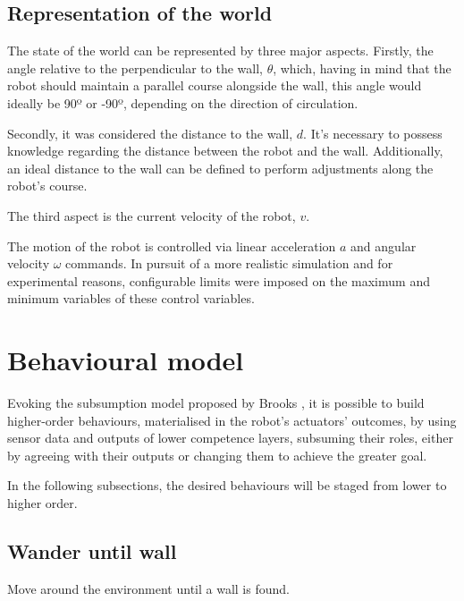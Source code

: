 \documentclass[conference]{IEEEtran}
\begin{document}

\subsection{Representation of the world} 

The state of the world can be represented by three major aspects. Firstly, the angle relative to the perpendicular to the wall, $\theta$, which, having in mind that the robot should maintain a parallel course alongside the wall, this angle would ideally be 90º or -90º, depending on the direction of circulation.

Secondly, it was considered the distance to the wall, $d$. It's necessary to possess knowledge regarding the distance between the robot and the wall. Additionally, an ideal distance to the wall can be defined to perform adjustments along the robot's course.

The third aspect is the current velocity of the robot, $v$. 

The motion of the robot is controlled via linear acceleration $a$ and angular velocity $\omega$ commands. In pursuit of a more realistic simulation and for experimental reasons, configurable limits were imposed on the maximum and minimum variables of these control variables. 

\section{Behavioural model} \label{behaviour}
Evoking the subsumption model proposed by Brooks \cite{1087032}, it is possible to build higher-order behaviours, materialised in the robot's actuators' outcomes, by using sensor data and outputs of lower competence layers, subsuming their roles, either by agreeing with their outputs or changing them to achieve the greater goal.

In the following subsections, the desired behaviours will be staged from lower to higher order.

\subsection{Wander until wall}
Move around the environment until a wall is found.
\end{document}
